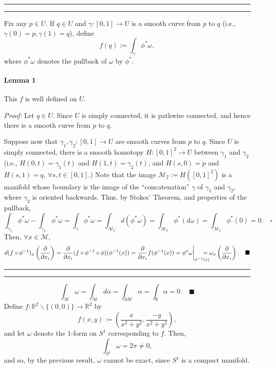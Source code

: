 \documentclass[11pt]{article}
\newcounter{questionCounter}
\newcounter{partCounter}[questionCounter]
\newenvironment{question}[2][\arabic{questionCounter}]{%
    \setcounter{partCounter}{0}%
    \vspace{.25in} \hrule \vspace{0.5em}%
        \noindent{\bf #2}%
    \vspace{0.8em} \hrule \vspace{.10in}%
    \addtocounter{questionCounter}{1}%
}{}
\renewcommand{\qed}{\quad \ensuremath{\blacksquare}}    %
\newcommand{\inv}{^{-1}}                %
\newcommand{\sminus}{\backslash}        %
\newcommand{\R}{\mathbb{R}}             %
\newcommand{\M}{\mathcal{M}}            %
\begin{document}
\newpage
\begin{question}{Problem 3}
Fix any $p \in U$. If $q \in U$ and $\gamma : [0,1] \to U$ is a smooth curve
from $p$ to $q$ (i.e., $\gamma(0) = p, \gamma(1) = q$), define
\[f(q) := \int_\gamma \phi^*\omega,\]
where $\phi^*\omega$ denotes the pullback of $\omega$ by $\phi^*$.

\paragraph{Lemma 1} This $f$ is well defined on $U$.

\emph{Proof:} Let $q \in U$. Since $U$ is simply connected, it is pathwise
connected, and hence there is a smooth curve from $p$ to $q$.

Suppose now that $\gamma_1,\gamma_2 : [0,1] \to U$ are smooth curves from $p$
to $q$. Since $U$ is simply connected, there is a smooth homotopy
$H : [0,1]^2 \to U$ between $\gamma_1$ and $\gamma_2$ (i.e.,
$H(0,t) = \gamma_1(t)$ and $H(1,t) = \gamma_2(t)$, and $H(s,0) = p$ and
$H(s,1) = q$, $\forall s,t \in [0,1]$.) Note that the image
$\M_2 := H([0,1]^2)$ is a manifold whose boundary is the image of the
``concatenation'' $\gamma$ of $\gamma_1$ and $\gamma_2$, where $\gamma_2$ is
oriented backwards. Thus, by Stokes' Theorem, and properties of the pullback,
\[ \int_{\gamma_1} \phi^*\omega - \int_{\gamma_2} \phi^*\omega
    = \int_{\gamma} \phi^*\omega
    = \int_{\M_2} d(\phi^*\omega)
    = \int_{\M_2} \phi^*(d\omega)
    = \int_{\M_2} \phi^*(0)
    = 0. \quad \square
\]
Then, $\forall x \in \M$,
\[d(f \circ \phi\inv)_x\left( \frac{\partial}{\partial x_i} \right)
    = \frac{\partial}{\partial x_i} (f \circ \phi\inv \circ \phi) (\phi\inv(x))
    = \frac{\partial}{\partial x_i} f (\phi\inv(x))
    = \phi^*\omega\bigg|_{\phi\inv(x)}
    \hspace{-5mm}= \omega_x\left(\frac{\partial}{\partial x_i}\right). \qed\]
\end{question}

\begin{question}{Problem 4}
\[\int_\M \omega
    = \int_\M d\alpha
    = \int_{\partial \M} \alpha
    = \int_\emptyset \alpha = 0. \qed
\]
Define $f : \R^2 \sminus \{(0,0)\} \to \R^2$ by
\[f(x,y) := \left( \frac{x}{x^2 + y^2}, \frac{-y}{x^2 + y^2} \right),\]
and let $\omega$ denote the $1$-form on $S^1$ corresponding to $f$. Then,
\[\int_{S^1} \omega = 2\pi \neq 0,\]
and so, by the previous result, $\omega$ cannot be exact, since $S^1$ is a
compact manifold.
\end{question}
\end{document}
